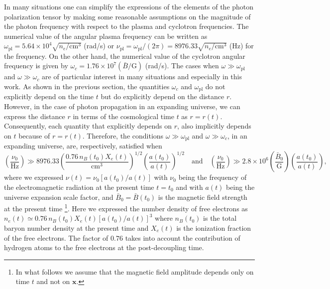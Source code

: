 \documentclass[a4paper,11pt]{article}
\newcommand{\bs}{\boldsymbol}
\begin{document}
In many situations one can simplify the expressions of the elements of the photon polarization tensor by making some reasonable assumptions on the magnitude of the photon frequency with respect to the plasma and cyclotron frequencies. The numerical value of the angular plasma frequency can be written as $\omega_\text{pl}=5.64\times 10^4 \sqrt{n_e/\text{cm}^3}$ (rad/s) or $\nu_\text{pl}=\omega_\text{pl}/(2\pi)=8976.33 \sqrt{n_e/\text{cm}^3}$ (Hz) for the frequency. On the other hand, the numerical value of the cyclotron angular frequency is given by $\omega_c=1.76\times 10^7(\bar B/\text{G})$ (rad/s). The cases when $\omega\gg \omega_\text{pl}$ and  $\omega\gg \omega_c$ are of particular interest in many situations and especially in this work. As shown in the previous section, the quantities $\omega_c$ and $\omega_\text{pl}$ do not explicitly depend on the time $t$ but do explicitly depend on the distance $r$. However, in the case of photon propagation in an expanding universe, we can express the distance $r$ in terms of the cosmological time $t$ as $r=r(t)$. Consequently, each quantity that explicitly depends on $r$, also implicitly depends on $t$ because of $r=r(t)$. Therefore, the conditions $\omega\gg \omega_\text{pl}$ and  $\omega\gg \omega_c$, in an expanding universe, are, respectively, satisfied when
\begin{equation}\label{nu-con-1}
\left(\frac{\nu_0}{\text{Hz}}\right)\gg 8976.33 \left(\frac{0.76\,n_B(t_0) X_e(t)}{\text{cm}^3}\right)^{1/2} \left(\frac{a(t_0)}{a(t)}\right)^{1/2} \quad \text{and} \quad \left(\frac{\nu_0}{\text{Hz}}\right)\gg 2.8\times 10^6 \left(\frac{\bar B_0}{\text{G}}\right)\left(\frac{a(t_0)}{a(t)}\right),
\end{equation}
where we expressed $\nu(t)=\nu_0 [a(t_0)/a(t)]$ with $\nu_0$ being the frequency of the electromagnetic radiation at the present time $t=t_0$ and with $a(t)$ being the universe expansion scale factor, and $\bar B_0=\bar B(t_0)$ is the magnetic field strength at the present time \footnote{In what follows we assume that the magnetic field amplitude depends only on time $t$ and not on $\bs x$.}. Here we expressed the number density of free electrons as $n_e(t)\simeq 0.76\, n_B(t_0) X_e(t)[a(t_0)/a(t)]^3$ where $n_B(t_0)$ is the total baryon number density at the present time and $X_e(t)$ is the ionization fraction of the free electrons. The factor of $0.76$ takes into account the contribution of hydrogen atoms to the free electrons at the post-decoupling time. 
\end{document}

